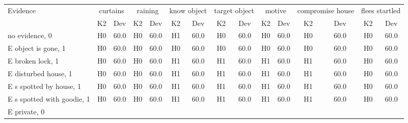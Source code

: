 \begin{table}\begin{tabular}{l|cc|cc|cc|cc|cc|cc|cc}\toprule\multirow{2}{*}{Evidence} & \multicolumn{2}{c}{curtains}& \multicolumn{2}{c}{raining}& \multicolumn{2}{c}{know object}& \multicolumn{2}{c}{target object}& \multicolumn{2}{c}{motive}& \multicolumn{2}{c}{compromise house}& \multicolumn{2}{c}{flees startled}\\& {K2} & {Dev}& {K2} & {Dev}& {K2} & {Dev}& {K2} & {Dev}& {K2} & {Dev}& {K2} & {Dev}& {K2} & {Dev}\\\midrule
no evidence, 0 & \cellcolor{Bittersweet}H0&\cellcolor{Bittersweet}60.0&\cellcolor{Bittersweet}H0&\cellcolor{Bittersweet}60.0&\cellcolor{Bittersweet}H1&\cellcolor{Bittersweet}60.0&\cellcolor{Bittersweet}H0&\cellcolor{Bittersweet}60.0&\cellcolor{Bittersweet}H0&\cellcolor{Bittersweet}60.0&\cellcolor{Bittersweet}H0&\cellcolor{Bittersweet}60.0&\cellcolor{Bittersweet}H0&\cellcolor{Bittersweet}60.0\\E object is gone, 1 & \cellcolor{Bittersweet}H0&\cellcolor{Bittersweet}60.0&\cellcolor{Bittersweet}H0&\cellcolor{Bittersweet}60.0&\cellcolor{Bittersweet}H0&\cellcolor{Bittersweet}60.0&\cellcolor{Bittersweet}H0&\cellcolor{Bittersweet}60.0&\cellcolor{Bittersweet}H0&\cellcolor{Bittersweet}60.0&\cellcolor{Bittersweet}H0&\cellcolor{Bittersweet}60.0&\cellcolor{Bittersweet}H0&\cellcolor{Bittersweet}60.0\\E broken lock, 1 & \cellcolor{Bittersweet}H0&\cellcolor{Bittersweet}60.0&\cellcolor{Bittersweet}H0&\cellcolor{Bittersweet}60.0&\cellcolor{Bittersweet}H1&\cellcolor{Bittersweet}60.0&\cellcolor{Bittersweet}H1&\cellcolor{Bittersweet}60.0&\cellcolor{Bittersweet}H1&\cellcolor{Bittersweet}60.0&\cellcolor{Bittersweet}H1&\cellcolor{Bittersweet}60.0&\cellcolor{Bittersweet}H0&\cellcolor{Bittersweet}60.0\\E disturbed house, 1 & \cellcolor{Bittersweet}H0&\cellcolor{Bittersweet}60.0&\cellcolor{Bittersweet}H0&\cellcolor{Bittersweet}60.0&\cellcolor{Bittersweet}H1&\cellcolor{Bittersweet}60.0&\cellcolor{Bittersweet}H1&\cellcolor{Bittersweet}60.0&\cellcolor{Bittersweet}H1&\cellcolor{Bittersweet}60.0&\cellcolor{Bittersweet}H1&\cellcolor{Bittersweet}60.0&\cellcolor{Bittersweet}H0&\cellcolor{Bittersweet}60.0\\E s spotted by house, 1 & \cellcolor{Bittersweet}H0&\cellcolor{Bittersweet}60.0&\cellcolor{Bittersweet}H0&\cellcolor{Bittersweet}60.0&\cellcolor{Bittersweet}H1&\cellcolor{Bittersweet}60.0&\cellcolor{Bittersweet}H1&\cellcolor{Bittersweet}60.0&\cellcolor{Bittersweet}H1&\cellcolor{Bittersweet}60.0&\cellcolor{Bittersweet}H1&\cellcolor{Bittersweet}60.0&\cellcolor{Bittersweet}H0&\cellcolor{Bittersweet}60.0\\E s spotted with goodie, 1 & \cellcolor{Bittersweet}H0&\cellcolor{Bittersweet}60.0&\cellcolor{Bittersweet}H0&\cellcolor{Bittersweet}60.0&\cellcolor{Bittersweet}H1&\cellcolor{Bittersweet}60.0&\cellcolor{Bittersweet}H1&\cellcolor{Bittersweet}60.0&\cellcolor{Bittersweet}H1&\cellcolor{Bittersweet}60.0&\cellcolor{Bittersweet}H1&\cellcolor{Bittersweet}60.0&\cellcolor{Bittersweet}H0&\cellcolor{Bittersweet}60.0\\E private, 0 & 
\end{tabular}
\end{table}
